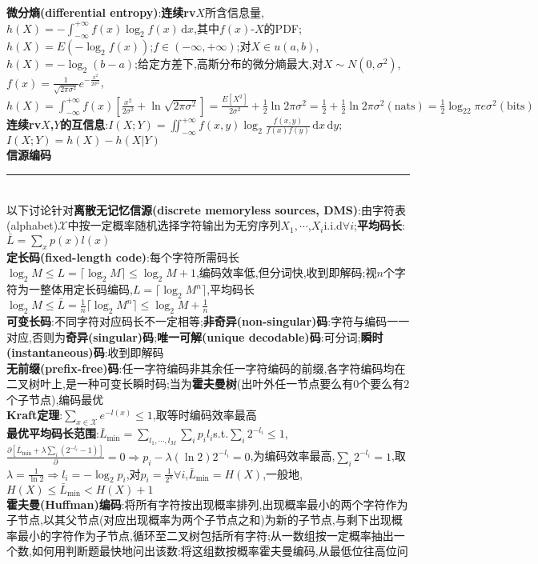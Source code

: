 \documentclass[UTF8,a4paper,10pt]{article}
\begin{document}
\begin{multicols*}{2}
\textbf{微分熵(differential entropy)}:\textbf{连续rv}$X$所含信息量,$h(X)=-\int_{-\infty}^{+\infty}f(x)\log_2f(x)\,\mathrm{d}x$,其中$f(x)$-$X$的PDF;$h(X)=E(-\log_2f(x))$;$f\in(-\infty,+\infty)$;对$X\in u(a,b)$,$h(X)=-\log_2(b-a)$;给定方差下,高斯分布的微分熵最大,对$X\sim N(0,\sigma^2)$,$f(x)=\frac{1}{\sqrt{2\pi\sigma^2}}e^{-\frac{x^2}{2\sigma^2}}$,$h(X)=\int_{-\infty}^{+\infty}f(x)[\frac{x^2}{2\sigma^2}+\ln\sqrt{2\pi\sigma^2}]=\frac{E[X^2]}{2\sigma^2}+\frac{1}{2}\ln 2\pi\sigma^2=\frac{1}{2}+\frac{1}{2}\ln 2\pi\sigma^2(\text{nats})=\frac{1}{2}\log_22\pi e\sigma^2(\text{bits})$\\
\textbf{连续rv$X$,$Y$的互信息}:$I(X;Y)=\iint_{-\infty}^{+\infty}f(x,y)\log_2\frac{f(x,y)}{f(x)f(y)}\,\mathrm{d}x\,\mathrm{d}y$;$I(X;Y)=h(X)-h(X\vert Y)$\\
\textbf{信源编码}\rule{\columnwidth-}{.2pt}\\
以下讨论针对\textbf{离散无记忆信源(discrete memoryless sources, DMS)}:由字符表(alphabet)$\mathcal{X}$中按一定概率随机选择字符输出为无穷序列$X_1,\cdots$,$X_i$i.i.d$\forall i$;\textbf{平均码长}:$\bar{L}=\sum_xp(x)l(x)$\\
\textbf{定长码(fixed-length code)}:每个字符所需码长$\log_2M\leq L=\lceil\log_2M\rceil\leq\log_2M+1$,编码效率低,但分词快,收到即解码;视$n$个字符为一整体用定长码编码,$L=\lceil\log_2M^n\rceil$,平均码长$\log_2M\leq\bar{L}=\frac{1}{n}\lceil\log_2M^n\rceil\leq\log_2M+\frac{1}{n}$\\
\textbf{可变长码}:不同字符对应码长不一定相等;\textbf{非奇异(non-singular)码}:字符与编码一一对应,否则为\textbf{奇异(singular)码};\textbf{唯一可解(unique decodable)码}:可分词;\textbf{瞬时(instantaneous)码}:收到即解码\\
\textbf{无前缀(prefix-free)码}:任一字符编码非其余任一字符编码的前缀,各字符编码均在二叉树叶上,是一种可变长瞬时码;当为\textbf{霍夫曼树}(出叶外任一节点要么有$0$个要么有$2$个子节点),编码最优\\
\textbf{Kraft定理}:$\sum_{x\in\mathcal{X}}e^{-l(x)}\leq 1$,取等时编码效率最高\\
\textbf{最优平均码长范围}:$\bar{L}_{\min}=\sum_{l_1,\cdots,l_M}\sum_ip_il_i$s.t.$\sum_i2^{-l_i}\leq 1$,$\frac{\partial[\bar{L}_{\min}+\lambda\sum_i(2^{-l_i}-1)]}{\partial}=0\Rightarrow p_i-\lambda(\ln 2)2^{-l_i}=0$,为编码效率最高,$\sum_i2^{-l_i}=1$,取$\lambda=\frac{1}{\ln 2}\Rightarrow l_i=-\log_2p_i$,对$p_i=\frac{1}{2^n}\forall i$,$\bar{L}_{\min}=H(X)$,一般地,$H(X)\leq\bar{L}_{\min}<H(X)+1$\\
\textbf{霍夫曼(Huffman)编码}:将所有字符按出现概率排列,出现概率最小的两个字符作为子节点,以其父节点(对应出现概率为两个子节点之和)为新的子节点,与剩下出现概率最小的字符作为子节点,循环至二叉树包括所有字符;从一数组按一定概率抽出一个数,如何用判断题最快地问出该数:将这组数按概率霍夫曼编码,从最低位往高位问\\

\end{multicols*}
\end{document}

